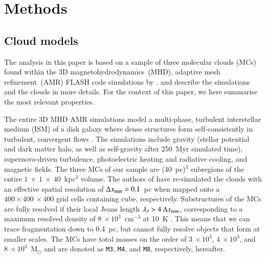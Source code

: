 \section{Methods}\label{methods}


\subsection{Cloud models}\label{methods:clouds}


The analysis in this paper is based on a sample of three molecular clouds (MCs) found within the 3D magnetohydrodynamics~(MHD), adaptive mesh refinement~(AMR) FLASH code \citep{Fryxell2000} simulations by \citet{IbanezMejia2016}.
\citet[hereafter  and , respectively]{IbanezMejia2016,IbanezMejia2017} and \citet[hereafter ]{Chira2018} describe the simulations and the clouds in more details. 
For the context of this paper, we here summarise the most relevant properties. 

The entire 3D MHD AMR simulations model a multi-phase, turbulent interstellar medium (ISM) of a disk galaxy where dense structures form self-consistently in turbulent, convergent flows . 
The simulations include gravity (stellar potential and dark matter halo, as well as self-gravity after 250~Myr simulated time), supernova-driven turbulence, photoelectric heating and radiative cooling, and magnetic fields. 
The three MCs of our sample are (40~pc)$^{3}$ subregions of the entire $1~\times~1~\times~40$~kpc$^3$ volume.
The authors of  have re-simulated the clouds with an effective spatial resolution of $\Delta x_{\rm min}=0.1$~pc when mapped onto a $400\times 400~\times 400$ grid cells containing cube, respectively.
Substructures of the MCs are fully resolved if their local Jeans length $\lambda_J > 4~\Delta x_{\rm min}$, corresponding to a maximum resolved density of $8~\times 10^3$~cm$^{-3}$ at 10~K .
This means that we can trace fragmentation down to 0.4~pc, but cannot fully resolve objects that form at smaller scales.
The MCs have total masses on the order of $3~\times 10^3$, $4~\times 10^3$, and $8~\times 10^3$~M$_{\odot}$ and are denoted as \texttt{M3}, \texttt{M4}, and \texttt{M8}, respectively, hereafter.


